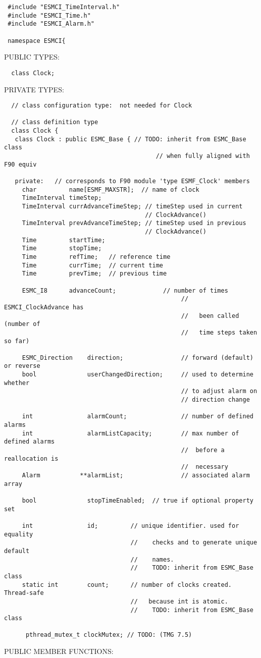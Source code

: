 \begin{verbatim} #include "ESMCI_TimeInterval.h"
 #include "ESMCI_Time.h"
 #include "ESMCI_Alarm.h"
 
 namespace ESMCI{
 \end{verbatim}{\sf PUBLIC TYPES:}
\begin{verbatim}  class Clock;
 \end{verbatim}{\sf PRIVATE TYPES:}
\begin{verbatim}  // class configuration type:  not needed for Clock
 
  // class definition type
  class Clock {
   class Clock : public ESMC_Base { // TODO: inherit from ESMC_Base class
                                          // when fully aligned with F90 equiv
 
   private:   // corresponds to F90 module 'type ESMF_Clock' members
     char         name[ESMF_MAXSTR];  // name of clock
     TimeInterval timeStep;
     TimeInterval currAdvanceTimeStep; // timeStep used in current
                                       // ClockAdvance()
     TimeInterval prevAdvanceTimeStep; // timeStep used in previous
                                       // ClockAdvance()
     Time         startTime;
     Time         stopTime;
     Time         refTime;   // reference time
     Time         currTime;  // current time
     Time         prevTime;  // previous time
 
     ESMC_I8      advanceCount;             // number of times
                                                 //   ESMCI_ClockAdvance has
                                                 //   been called (number of
                                                 //   time steps taken so far)
 
     ESMC_Direction    direction;                // forward (default) or reverse
     bool              userChangedDirection;     // used to determine whether
                                                 // to adjust alarm on 
                                                 // direction change
 
     int               alarmCount;               // number of defined alarms
     int               alarmListCapacity;        // max number of defined alarms
                                                 //  before a reallocation is
                                                 //  necessary
     Alarm           **alarmList;                // associated alarm array
 
     bool              stopTimeEnabled;  // true if optional property set
 
     int               id;         // unique identifier. used for equality
                                   //    checks and to generate unique default
                                   //    names.
                                   //    TODO: inherit from ESMC_Base class
     static int        count;      // number of clocks created. Thread-safe
                                   //   because int is atomic.
                                   //    TODO: inherit from ESMC_Base class
 
      pthread_mutex_t clockMutex; // TODO: (TMG 7.5)
 \end{verbatim}{\sf PUBLIC MEMBER FUNCTIONS:}
